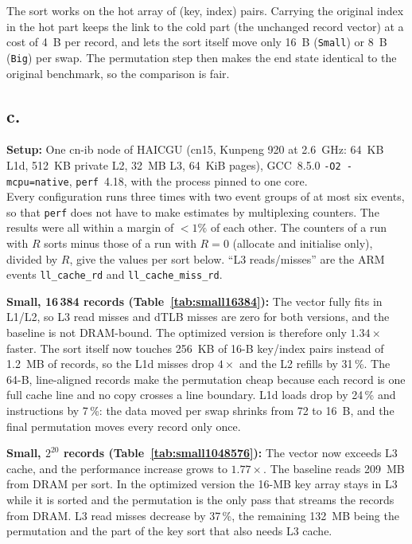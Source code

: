 \documentclass[a4paper,11pt]{article}
\begin{document}
The sort works on the hot array of (key, index) pairs. Carrying the original index in the hot part keeps the link to the
cold part (the unchanged record vector) at a cost of 4~B per record, and lets the sort
itself move only 16~B (\texttt{Small}) or 8~B (\texttt{Big}) per swap. The permutation
step then makes the end state identical to the original benchmark, so the comparison is fair.

\subsection{c.}
\textbf{Setup:} One cn-ib node of HAICGU (cn15, Kunpeng 920 at 2.6~GHz: 64~KB
L1d, 512~KB private L2, 32~MB L3, 64~KiB pages), GCC~8.5.0 \texttt{-O2 -mcpu=native},
\texttt{perf}~4.18, with the process pinned to one core. \\
Every configuration runs three times with two event groups of at most six events, so that \texttt{perf} does not have to make estimates by multiplexing counters.
The results were all within a margin of $<1\%$ of each other.
The counters of a run with $R$ sorts minus those of a run with
$R=0$ (allocate and initialise only), divided by $R$, give the values per sort below.
``L3 reads/misses'' are the ARM events \texttt{ll\_cache\_rd} and
\texttt{ll\_cache\_miss\_rd}.





\textbf{Small, 16\,384 records (Table~\ref{tab:small16384}):} The vector 
fully fits in L1/L2, so L3 read misses and dTLB misses are zero for both
versions, and the baseline is not DRAM-bound. The
optimized version is therefore only $1.34\times$ faster. 
The sort itself now touches 256~KB of 16-B
key/index pairs instead of 1.2~MB of records, so the L1d misses drop $4\times$ and the L2
refills by 31\,\%. The 64-B, line-aligned records make the permutation cheap because each 
record is one full cache line and no copy crosses a line boundary.
L1d loads drop by 24\,\% and instructions by 7\,\%: the data moved per
swap shrinks from 72 to 16~B, and the final permutation moves every record only once.

\textbf{Small, $2^{20}$ records (Table~\ref{tab:small1048576}):} The vector now exceeds
L3 cache, and the performance increase grows to $1.77\times$. The baseline
reads 209~MB from DRAM per sort. In the optimized version the 16-MB key array stays in
L3 while it is sorted and the permutation is the only pass that streams the records from DRAM.
L3 read misses decrease by 37\,\%, the remaining 132~MB being the permutation
and the part of the key sort that also needs L3 cache.
\end{document}
